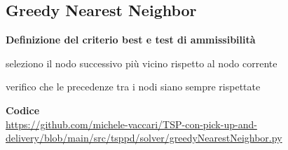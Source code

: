 \documentclass[9pt]{beamer}
\begin{document}
\subsection{Greedy Nearest Neighbor}
\begin{frame}[allowframebreaks]{\subsecname}
	\textbf{Definizione del criterio best e test di ammissibilità}
      \begin{description}[style=unboxed,leftmargin=0cm]
        \item[criterio best] seleziono il nodo successivo più vicino rispetto al nodo corrente
	  \item[test di ammissibilità] verifico che le precedenze tra i nodi siano sempre rispettate
      \end{description}

	\textbf{Codice} \\
		\href{https://github.com/michele-vaccari/TSP-con-pick-up-and-delivery/blob/main/src/tsppd/solver/greedyNearestNeighbor.py}{https://github.com/michele-vaccari/TSP-con-pick-up-and-delivery/blob/main/src/tsppd/solver/greedyNearestNeighbor.py}

\framebreak


\end{frame}
\end{document}
